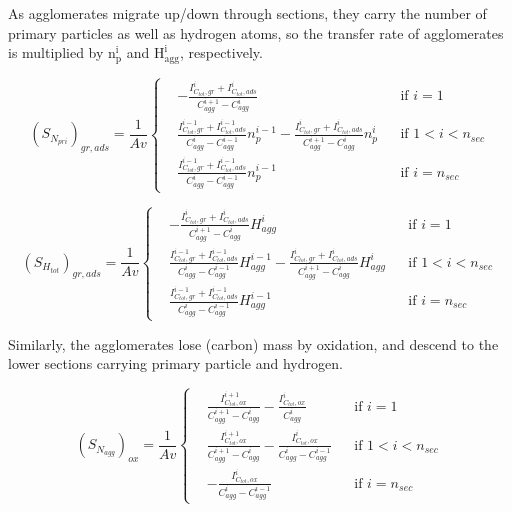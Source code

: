 As agglomerates migrate up/down through sections, they carry the number of primary particles as well as hydrogen atoms, so the transfer rate of agglomerates is multiplied by $\mathrm{n^i_p}$ and $\mathrm{H^i_{agg}}$, respectively. 

\begin{equation}
	\left(S_{N_{pri}}\right)_{gr, ads}=
	\frac{1}{Av}
	\left\{
	\begin{aligned}
		&-\frac{I^i_{C_{tot},gr}+I^i_{C_{tot},ads}}{C^{i+1}_{agg}-C^{i}_{agg}}
		&&
		\text{if } i = 1
		\\
		&\frac{I^{i-1}_{C_{tot},gr}+I^{i-1}_{C_{tot},ads}}{C^{i}_{agg}-C^{i-1}_{agg}}n^{i-1}_p
		-\frac{I^{i}_{C_{tot},gr}+I^{i}_{C_{tot},ads}}{C^{i+1}_{agg}-C^{i}_{agg}}n^{i}_p
		&&
		\text{if } 1 < i < n_{sec}
		\\
		&\frac{I^{i-1}_{C_{tot},gr}+I^{i-1}_{C_{tot},ads}}{C^{i}_{agg}-C^{i-1}_{agg}}n^{i-1}_p
		&&\text{if } i=n_{sec}
	\end{aligned}
	\right.
	\label{eqn:S_Npri_gradssect}
\end{equation}

\begin{equation}
	\left(S_{H_{tot}}\right)_{gr, ads}=
	\frac{1}{Av}
	\left\{
	\begin{aligned}
		&-\frac{I^i_{C_{tot},gr}+I^i_{C_{tot},ads}}{C^{i+1}_{agg}-C^{i}_{agg}}H^{i}_{agg}
		&&
		\text{if } i = 1
		\\
		&\frac{I^{i-1}_{C_{tot},gr}+I^{i-1}_{C_{tot},ads}}{C^{i}_{agg}-C^{i-1}_{agg}}H^{i-1}_{agg}
		-\frac{I^{i}_{C_{tot},gr}+I^{i}_{C_{tot},ads}}{C^{i+1}_{agg}-C^{i}_{agg}}H^{i}_{agg}
		&&
		\text{if } 1 < i < n_{sec}
		\\
		&\frac{I^{i-1}_{C_{tot},gr}+I^{i-1}_{C_{tot},ads}}{C^{i}_{agg}-C^{i-1}_{agg}}H^{i-1}_{agg}
		&&\text{if } i=n_{sec}
	\end{aligned}
	\right.
	\label{eqn:S_Htot_gradssect}
\end{equation}

Similarly, the agglomerates lose (carbon) mass by oxidation, and descend to the lower sections carrying primary particle and hydrogen.

\begin{equation}
	\left(S_{N_{agg}}\right)_{ox}=
	\frac{1}{Av}
	\left\{
	\begin{aligned}
		&\frac{I^{i+1}_{C_{tot},ox}}{C^{i+1}_{agg}-C^{i}_{agg}}
		-
		\frac{I^{i}_{C_{tot},ox}}{C^{i}_{agg}}
		&&
		\text{if } i = 1
		\\
		&\frac{I^{i+1}_{C_{tot},ox}}{C^{i+1}_{agg}-C^{i}_{agg}}
		-
		\frac{I^{i}_{C_{tot},ox}}{C^{i}_{agg}-C^{i-1}_{agg}}
		&&
		\text{if } 1 < i < n_{sec}
		\\
		&
		-
		\frac{I^{i}_{C_{tot},ox}}{C^{i}_{agg}-C^{i-1}_{agg}}
		&&\text{if } i=n_{sec}
	\end{aligned}
	\right.
	\label{eqn:S_Nagg_oxsect}
\end{equation}

